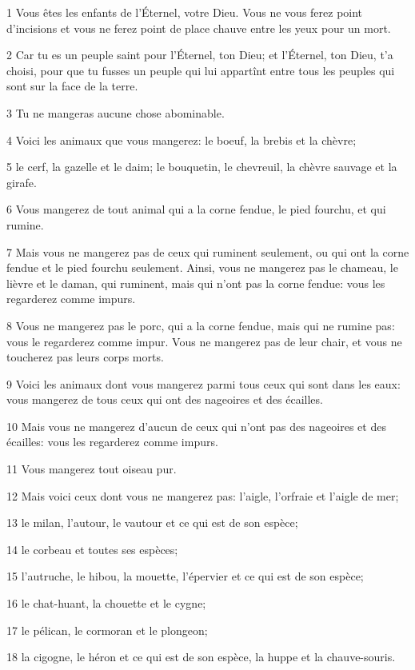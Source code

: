 \par 1 Vous êtes les enfants de l'Éternel, votre Dieu. Vous ne vous ferez point d'incisions et vous ne ferez point de place chauve entre les yeux pour un mort.
\par 2 Car tu es un peuple saint pour l'Éternel, ton Dieu; et l'Éternel, ton Dieu, t'a choisi, pour que tu fusses un peuple qui lui appartînt entre tous les peuples qui sont sur la face de la terre.
\par 3 Tu ne mangeras aucune chose abominable.
\par 4 Voici les animaux que vous mangerez: le boeuf, la brebis et la chèvre;
\par 5 le cerf, la gazelle et le daim; le bouquetin, le chevreuil, la chèvre sauvage et la girafe.
\par 6 Vous mangerez de tout animal qui a la corne fendue, le pied fourchu, et qui rumine.
\par 7 Mais vous ne mangerez pas de ceux qui ruminent seulement, ou qui ont la corne fendue et le pied fourchu seulement. Ainsi, vous ne mangerez pas le chameau, le lièvre et le daman, qui ruminent, mais qui n'ont pas la corne fendue: vous les regarderez comme impurs.
\par 8 Vous ne mangerez pas le porc, qui a la corne fendue, mais qui ne rumine pas: vous le regarderez comme impur. Vous ne mangerez pas de leur chair, et vous ne toucherez pas leurs corps morts.
\par 9 Voici les animaux dont vous mangerez parmi tous ceux qui sont dans les eaux: vous mangerez de tous ceux qui ont des nageoires et des écailles.
\par 10 Mais vous ne mangerez d'aucun de ceux qui n'ont pas des nageoires et des écailles: vous les regarderez comme impurs.
\par 11 Vous mangerez tout oiseau pur.
\par 12 Mais voici ceux dont vous ne mangerez pas: l'aigle, l'orfraie et l'aigle de mer;
\par 13 le milan, l'autour, le vautour et ce qui est de son espèce;
\par 14 le corbeau et toutes ses espèces;
\par 15 l'autruche, le hibou, la mouette, l'épervier et ce qui est de son espèce;
\par 16 le chat-huant, la chouette et le cygne;
\par 17 le pélican, le cormoran et le plongeon;
\par 18 la cigogne, le héron et ce qui est de son espèce, la huppe et la chauve-souris.
